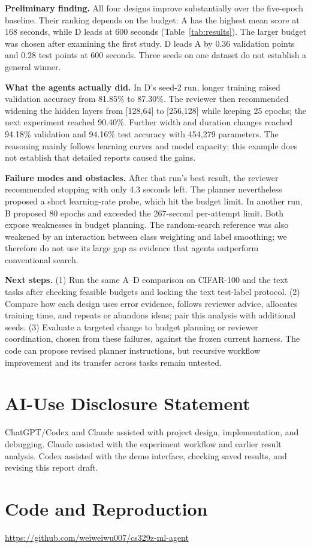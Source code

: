 \documentclass{article}
\newcommand{\coderepo}{\url{https://github.com/weiweiwu007/cs329z-ml-agent}}
\begin{document}
\textbf{Preliminary finding.} All four designs improve substantially over the five-epoch baseline. Their ranking depends on the budget: A has the highest mean score at 168 seconds, while D leads at 600 seconds (Table~\ref{tab:results}). The larger budget was chosen after examining the first study. D leads A by 0.36 validation points and 0.28 test points at 600 seconds. Three seeds on one dataset do not establish a general winner.

\textbf{What the agents actually did.} In D's seed-2 run, longer training raised validation accuracy from 81.85\% to 87.30\%. The reviewer then recommended widening the hidden layers from [128,64] to [256,128] while keeping 25 epochs; the next experiment reached 90.40\%. Further width and duration changes reached 94.18\% validation and 94.16\% test accuracy with 454,279 parameters. The reasoning mainly follows learning curves and model capacity; this example does not establish that detailed reports caused the gains.

\textbf{Failure modes and obstacles.} After that run's best result, the reviewer recommended stopping with only 4.3 seconds left. The planner nevertheless proposed a short learning-rate probe, which hit the budget limit. In another run, B proposed 80 epochs and exceeded the 267-second per-attempt limit. Both expose weaknesses in budget planning. The random-search reference was also weakened by an interaction between class weighting and label smoothing; we therefore do not use its large gap as evidence that agents outperform conventional search.

\textbf{Next steps.} (1) Run the same A--D comparison on CIFAR-100 and the text tasks after checking feasible budgets and locking the text test-label protocol. (2) Compare how each design uses error evidence, follows reviewer advice, allocates training time, and repeats or abandons ideas; pair this analysis with additional seeds. (3) Evaluate a targeted change to budget planning or reviewer coordination, chosen from these failures, against the frozen current harness. The code can propose revised planner instructions, but recursive workflow improvement and its transfer across tasks remain untested. 

\clearpage
\begingroup
\raggedright
\renewcommand{\bibsection}{\section{References}}


\endgroup

\section{AI-Use Disclosure Statement}
ChatGPT/Codex and Claude assisted with project design, implementation, and debugging. Claude assisted with the experiment workflow and earlier result analysis. Codex assisted with the demo interface, checking saved results, and revising this report draft.

\section*{Code and Reproduction}
\coderepo\par
\end{document}
